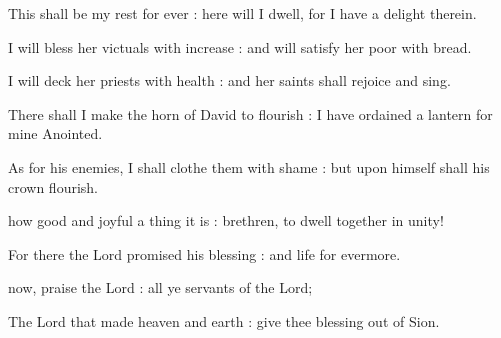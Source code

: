 This shall be my rest for ever : here will I dwell, for I have a delight therein.\par
{}I will bless her victuals with increase : and will satisfy her poor with bread.\par
{}I will deck her priests with health : and her saints shall rejoice and sing.\par
{}There shall I make the horn of David to flourish : I have ordained a lantern for mine Anointed.\par
{}As for his enemies, I shall clothe them with shame : but upon himself shall his crown flourish.\par


 how good and joyful a thing it is : brethren, to dwell together in unity!\par
{}
For there the Lord promised his blessing : and life for evermore.\par


 now, praise the Lord : all ye servants of the Lord;\par
{}
The Lord that made heaven and earth : give thee blessing out of Sion.\par


